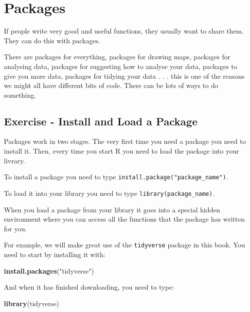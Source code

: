 \documentclass[
]{book}
\newenvironment{Shaded}{\begin{snugshade}}{\end{snugshade}}
\newcommand{\KeywordTok}[1]{\textcolor[rgb]{0.13,0.29,0.53}{\textbf{#1}}}
\newcommand{\NormalTok}[1]{#1}
\newcommand{\StringTok}[1]{\textcolor[rgb]{0.31,0.60,0.02}{#1}}
\begin{document}
\hypertarget{packages}{%
\section{Packages}\label{packages}}

If people write very good and useful functions, they usually want to share them. They can do this with packages.

There are packages for everything, packages for drawing maps, packages for analysing data, packages for suggesting how to analyse your data, packages to give you more data, packages for tidying your data . . . this is one of the reasons we might all have different bits of code. There can be lots of ways to do something.

\hypertarget{ex_packages}{%
\subsection{Exercise - Install and Load a Package}\label{ex_packages}}

Packages work in two stages. The very first time you need a package you need to install it. Then, every time you start R you need to load the package into your livrary.

To install a package you need to type \texttt{install.package("package\_name")}.

To load it into your library you need to type \texttt{library(package\_name)}.

When you load a package from your library it goes into a special hidden environment where you can access all the functions that the package has written for you.

For example, we will make great use of the \texttt{tidyverse} package in this book. You need to start by installing it with:

\begin{Shaded}
\begin{Highlighting}[]
\KeywordTok{install.packages}\NormalTok{(}\StringTok{"tidyverse"}\NormalTok{)}
\end{Highlighting}
\end{Shaded}

And when it has finished downloading, you need to type:

\begin{Shaded}
\begin{Highlighting}[]
\KeywordTok{library}\NormalTok{(tidyverse)}
\end{Highlighting}
\end{Shaded}
\end{document}
